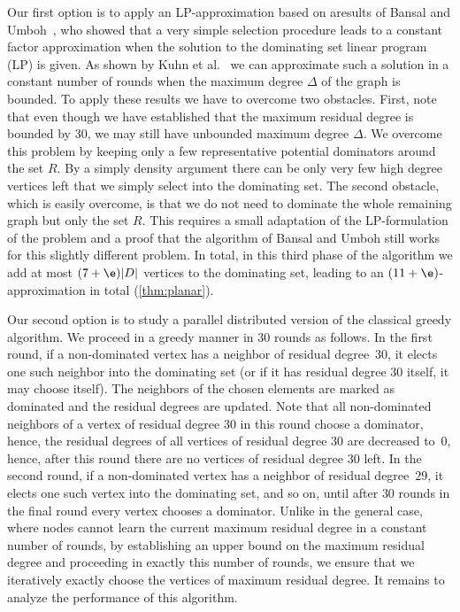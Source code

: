Our first option is to apply an LP-approximation based on
aresults of Bansal and Umboh~\cite{bansal2017tight}, who showed
that a very simple selection procedure leads to a constant factor
approximation when the solution to the dominating set linear
program (LP) is given. As shown by Kuhn et al.~\cite{kuhn2006price} we can approximate such a solution in a
constant number of rounds when the maximum degree $\Delta$
of the graph is bounded.
To apply these results we have to overcome two obstacles. First,
note that even though we have established that the maximum residual
degree is bounded by $30$, we may still have unbounded maximum
degree $\Delta$. We overcome this problem by keeping only a few
representative potential dominators around the set $R$. By a simply
density argument there can be only very few high degree vertices left
that we simply select into the dominating set. The second obstacle,
which is easily overcome, is that we do not need to dominate the
whole remaining graph but only the set $R$. This requires a small
adaptation of the LP-formulation of the problem and a proof that the
algorithm of Bansal and Umboh still works for this slightly different problem.
In total, in this third phase of the algorithm we add at most $(7+\e)|D|$ vertices to
the dominating set, leading to an
$(11+\e)$\hspace{1pt}-\hspace{1pt}approximation in total (\cref{thm:planar}).

\smallskip
Our second option is to study a parallel distributed version of the
classical greedy algorithm. We proceed in a greedy manner in $30$ rounds as follows. In the first round, if a non-dominated
vertex has a neighbor of residual degree~$30$, it elects one such neighbor into
the dominating set (or if it has residual degree $30$ itself, it may choose itself).
The neighbors of the chosen elements are
marked as dominated and the residual degrees are updated. Note that
all non-dominated neighbors of a vertex of residual degree $30$
in this round choose a dominator, hence, the residual degrees
of all vertices of residual degree $30$ are decreased to~$0$, hence, after
this round there are no vertices of residual degree $30$ left.
In the second round, if a non-dominated vertex has a neighbor
of residual degree~$29$, it elects
one such vertex into the dominating set, and so on, until after $30$ rounds
in the final round every vertex chooses a dominator. Unlike in the general
case, where
nodes cannot learn the current maximum residual degree in a constant
number of rounds, by establishing
an upper bound on the maximum residual degree and proceeding in exactly
this number of rounds, we ensure that we iteratively exactly choose the
vertices of maximum residual degree. It remains to analyze the performance
of this algorithm.


